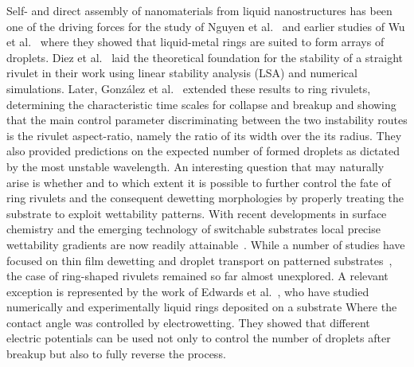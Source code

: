 \documentclass[twoside,twocolumn,9pt]{article}
\begin{document}
Self- and direct assembly of nanomaterials from liquid nanostructures has been one of the driving forces for the study of Nguyen et al.~\cite{nguyenCompetitionCollapseBreakup2012} and earlier studies of Wu et al.~\cite{wuBreakupPatternedNanoscale2010} where they showed that liquid-metal rings are suited to form arrays of droplets.
Diez et al.~\cite{diezBreakupFluidRivulets2009, diezStabilityFinitelengthRivulet2009} laid the theoretical foundation for the stability of a straight rivulet in their work using linear stability analysis (LSA) and numerical simulations. 
Later, Gonz{\'a}lez et al.~\cite{gonzalezStabilityLiquidRing2013} extended these results to ring rivulets, determining the characteristic time scales for collapse and breakup and showing that the main control parameter discriminating between the two instability routes is the rivulet aspect-ratio, namely the ratio of its width over the its radius.
They also provided predictions on the expected number of formed droplets as dictated by the most unstable wavelength.
An interesting question that may naturally arise is whether and to which extent it is possible to further control the fate of ring rivulets and the consequent dewetting morphologies by properly treating the substrate to exploit wettability patterns. 
With recent developments in surface chemistry and the emerging technology of switchable substrates local precise wettability gradients are now readily attainable~\cite{xinReversiblySwitchableWettability2010, stuartEmergingApplicationsStimuliresponsive2010,chenThermalresponsiveHydrogelSurface2010, ichimuraLightDrivenMotionLiquids2000, mugeleElectrowettingConvenientWay2005, edwardsControllingBreakupToroidal2021}.
While a number of studies have focused on thin film dewetting and droplet transport on patterned substrates~\cite{liuActuatingWaterDroplets2015,grawitterSteeringDropletsSubstrates2021, zitzControllingDewettingMorphologies2023}, the case of ring-shaped rivulets remained so far almost unexplored.
A relevant exception is represented by the work of Edwards et al.~\cite{edwardsControllingBreakupToroidal2021}, who have studied numerically and experimentally liquid rings deposited on a substrate Where the contact angle was controlled by electrowetting. 
They showed that different electric potentials can be used not only to control the number of droplets after breakup but also to fully reverse the process.
\end{document}
